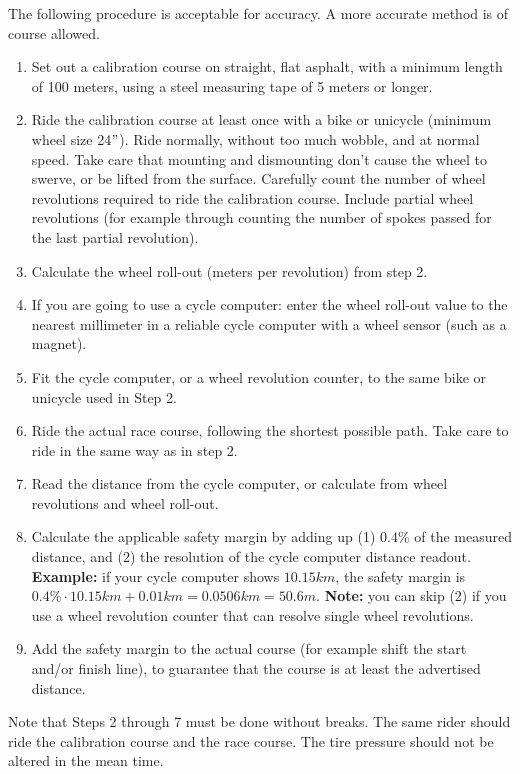 The following procedure is acceptable for accuracy.
A more accurate method is of course allowed.
\begin{enumerate}
\item Set out a calibration course on straight, flat asphalt, with a minimum length of 100 meters, using a steel measuring tape of 5 meters or longer.
\item Ride the calibration course at least once with a bike or unicycle (minimum wheel size 24$"$).
Ride normally, without too much wobble, and at normal speed.
Take care that mounting and dismounting don't cause the wheel to swerve, or be lifted from the surface.
Carefully count the number of wheel revolutions required to ride the calibration course.
Include partial wheel revolutions (for example through counting the number of spokes passed for the last partial revolution).
\item Calculate the wheel roll-out (meters per revolution) from step 2.
\item If you are going to use a cycle computer: enter the wheel roll-out value to the nearest millimeter in a reliable cycle computer with a wheel sensor (such as a magnet).
\item Fit the cycle computer, or a wheel revolution counter, to the same bike or unicycle used in Step 2.
\item Ride the actual race course, following the shortest possible path.
Take care to ride in the same way as in step 2.
\item Read the distance from the cycle computer, or calculate from wheel revolutions and wheel roll-out.
\item Calculate the applicable safety margin by adding up (1) $0.4\%$ of the measured distance, and (2) the resolution of the cycle computer distance readout.
\textbf{Example:} if your cycle computer shows $10.15\unit{km}$, the safety margin is $0.4\% \cdot 10.15\unit{km} + 0.01\unit{km} = 0.0506\unit{km} = 50.6\unit{m}$.
\textbf{Note:} you can skip (2) if you use a wheel revolution counter that can resolve single wheel revolutions.
\item Add the safety margin to the actual course (for example shift the start and/or finish line), to guarantee that the course is at least the advertised distance.
\end{enumerate}
Note that Steps 2 through 7 must be done without breaks.
The same rider should ride the calibration course and the race course.
The tire pressure should not be altered in the mean time.

